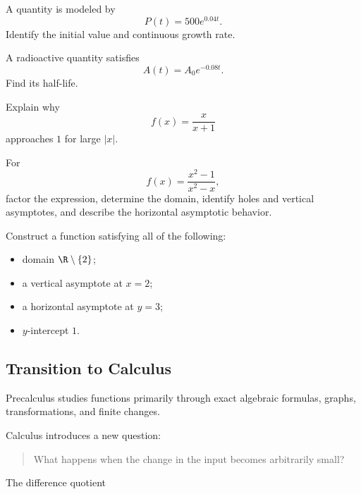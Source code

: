 \begin{exercise}[2]
A quantity is modeled by
\[ P(t)=500e^{0.04t}. \]
Identify the initial value and continuous growth rate.
\end{exercise}

\begin{exercise}[2]
A radioactive quantity satisfies
\[ A(t)=A_0e^{-0.08t}. \]
Find its half-life.
\end{exercise}

\begin{exercise}[2]
Explain why
\[ f(x)=\frac{x}{x+1} \]
approaches \(1\) for large \(|x|\).
\end{exercise}

\begin{exercise}[3]
For
\[ f(x)=\frac{x^2-1}{x^2-x}, \]
factor the expression, determine the domain, identify holes and vertical
asymptotes, and describe the horizontal asymptotic behavior.
\end{exercise}

\begin{exercise}[3]
Construct a function satisfying all of the following:
\begin{itemize}
    \item domain \(\R\setminus\{2\}\);
    \item a vertical asymptote at \(x=2\);
    \item a horizontal asymptote at \(y=3\);
    \item \(y\)-intercept \(1\).
\end{itemize}
\end{exercise}

\subsection{Transition to Calculus}
\label{subsec:transition-to-calculus}

Precalculus studies functions primarily through exact algebraic formulas,
graphs, transformations, and finite changes.

Calculus introduces a new question:

\begin{quote}
What happens when the change in the input becomes arbitrarily small?
\end{quote}

The difference quotient

